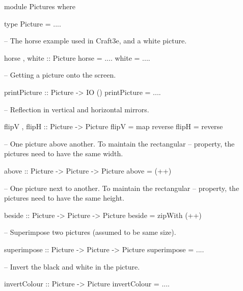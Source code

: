 module Pictures where

type Picture = ....

-- The horse example used in Craft3e, and a white picture.

horse , white :: Picture
horse = ....
white = ....

-- Getting a picture onto the screen.

printPicture :: Picture -> IO ()
printPicture = ....

-- Reflection in vertical and horizontal mirrors.

flipV , flipH :: Picture -> Picture
flipV = map reverse
flipH = reverse

-- One picture above another. To maintain the rectangular 
-- property, the pictures need to have the same width.

above :: Picture -> Picture -> Picture
above = (++)

-- One picture next to another. To maintain the rectangular 
-- property, the pictures need to have the same height.

beside :: Picture -> Picture -> Picture
beside = zipWith (++)

-- Superimpose two pictures (assumed to be same size). 

superimpose :: Picture -> Picture -> Picture
superimpose = ....

-- Invert the black and white in the picture.

invertColour :: Picture -> Picture
invertColour = ....
